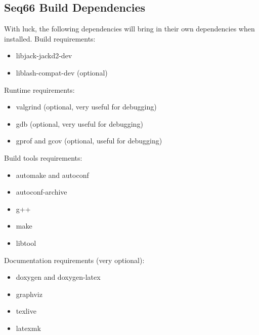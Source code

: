 \subsection{Seq66 Build Dependencies}
\label{subsec:build_dependencies}

   With luck, the following dependencies will bring in their own
   dependencies when installed.  Build requirements:

     \begin{itemize}
        \item libjack-jackd2-dev
        \item liblash-compat-dev (optional)
     \end{itemize}

   Runtime requirements:

     \begin{itemize}
        \item valgrind (optional, very useful for debugging)
        \item gdb (optional, very useful for debugging)
        \item gprof and gcov (optional, useful for debugging)
     \end{itemize}

   Build tools requirements:

     \begin{itemize}
        \item automake and autoconf
        \item autoconf-archive
        \item g++
        \item make
        \item libtool
     \end{itemize}

   Documentation requirements (very optional):

     \begin{itemize}
        \item doxygen and doxygen-latex
        \item graphviz
        \item texlive
        \item latexmk
     \end{itemize}
      
